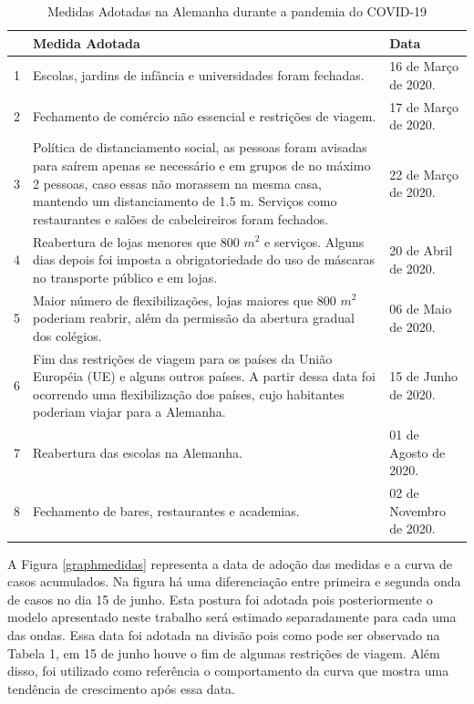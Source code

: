 \documentclass[12pt]{article}
\begin{document}
\begin{table}[h]
\label{medidas}
\centering
\begin{small}
\caption{Medidas Adotadas na Alemanha durante a pandemia do COVID-19} 
\begin{tabular}{|p{0.5cm}|p{10cm}|p{4.5cm}|}
\hline
             & Medida Adotada & Data\\
\hline
1& Escolas, jardins de infância e universidades foram fechadas.          & 16 de Março de 2020. \\
\hline
2& Fechamento de comércio não essencial e restrições de viagem.          & 17 de Março de 2020. \\
\hline

3& Política de distanciamento social, as pessoas foram avisadas para saírem apenas se necessário e em grupos de no máximo 2 pessoas, caso essas não morassem na mesma casa, mantendo um distanciamento de 1.5 m. Serviços como restaurantes e salões de cabeleireiros foram fechados.  & 22 de Março de 2020. \\

\hline

4 & Reabertura de lojas menores que 800 $m^2$ e serviços. Alguns dias depois foi imposta a obrigatoriedade do uso de máscaras no transporte público e em lojas. & 20 de Abril de 2020. \\

\hline
5 & Maior número de flexibilizações, lojas maiores que 800 $m^2$ poderiam reabrir, além da permissão da abertura gradual dos colégios. & 06 de Maio de 2020. \\

\hline

6 & Fim das restrições de viagem para os países da União Européia (UE) e alguns outros países. A partir dessa data foi ocorrendo uma flexibilização dos países, cujo habitantes poderiam viajar para a Alemanha. & 15 de Junho de 2020.\\
\hline 

7 & Reabertura das escolas na Alemanha. & 01 de Agosto de 2020.\\
\hline

8 & Fechamento de bares, restaurantes e academias. & 02 de Novembro de 2020. \\
\hline
\end{tabular}
\end{small}
\end{table}

A Figura \ref{graphmedidas} representa a data de adoção das medidas e a curva de casos acumulados. Na figura há uma diferenciação entre primeira e segunda onda de casos no dia 15 de junho. Esta postura foi adotada pois posteriormente o modelo apresentado neste trabalho será estimado separadamente para cada uma das ondas. Essa data foi adotada na divisão pois como pode ser observado na Tabela 1, em 15 de junho houve o fim de algumas restrições de viagem. Além disso, foi utilizado como referência o comportamento da curva que mostra uma tendência de crescimento após essa data. 
\end{document}

